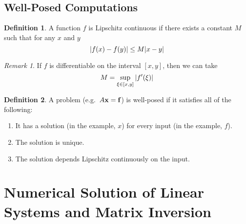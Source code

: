 \documentclass[11pt,letterpaper]{article}
\numberwithin{figure}{section} %
\newcommand{\keyword}[1]{\colorbox{cyan!20!}{#1}}
\theoremstyle{definition}
\theoremstyle{definition}
\theoremstyle{definition}
\newtheorem{definition}{Definition}[subsection]
\theoremstyle{definition}
\theoremstyle{remark}
\newtheorem*{remark}{Remark}
\theoremstyle{remark}
\theoremstyle{definition}
\theoremstyle{remark}
\theoremstyle{remark}
\begin{document}
\begin{multicols*}{3}
\subsection{Well-Posed Computations}
\begin{definition}
	A function $f$ is \keyword{Lipschitz continuous} if there exists
	a constant $M$ such that for any $x$ and $y$
	\[
		\abs{f(x) - f(y)} \leq M\abs{x - y}
	\]
\end{definition}
\begin{remark}
	If $f$ is differentiable on the interval $[x,y]$, then we can take
	\[
		M = \sup_{\xi \in [x, y]} \abs{f'(\xi)}
	\]
\end{remark}
\begin{definition}
	A problem (e.g.\ $A\vb{x} = \vb{f}$) is \keyword{well-posed} if it satisfies
	all of the following:
	\begin{enumerate}[label={(\alph*)}]
		\item It has a solution (in the example, $x$) for every input (in the
			example, $f$).
		\item The solution is unique.
		\item The solution depends Lipschitz continuously on the input.

	\end{enumerate}
\end{definition}
\section{Numerical Solution of Linear Systems and Matrix Inversion}

\end{multicols*}
\end{document}
